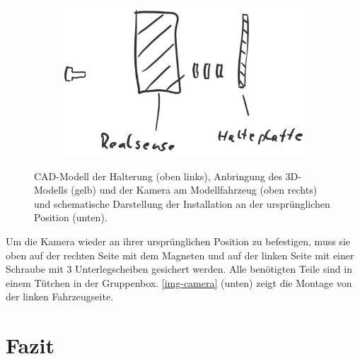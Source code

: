 \documentclass[a4paper,12pt]{report}
\begin{document}
\begin{figure}[ht]
\begin{subfigure}{\textwidth}
		\centering
		\includegraphics[width=.5\textwidth]{assets/RealSense-Montage2.PNG}
	\end{subfigure}
	\caption{CAD-Modell der Halterung (oben links), Anbringung des 3D-Modells (gelb) und der Kamera am Modellfahrzeug (oben rechts) und schematische Darstellung der Installation an der ursprünglichen Position (unten).}
	\label{img-camera}
\end{figure}
Um die Kamera wieder an ihrer ursprünglichen Position zu befestigen, muss sie oben auf der rechten Seite mit dem Magneten und auf der linken Seite mit einer Schraube mit 3 Unterlegscheiben gesichert werden. Alle benötigten Teile sind in einem Tütchen in der Gruppenbox. \autoref{img-camera} (unten) zeigt die Montage von der linken Fahrzeugseite.


\chapter{Fazit}
\end{document}
